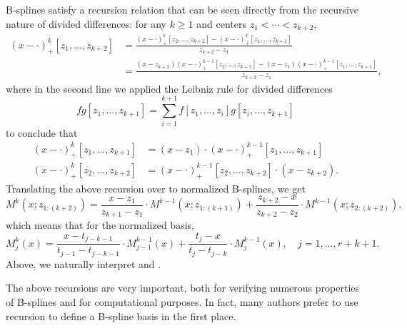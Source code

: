 \documentclass{article}
\begin{document}
B-splines satisfy a recursion relation that can be seen directly from the
recursive nature of divided differences: for any $k \geq 1$ and centers $z_1 <
\cdots < z_{k+2}$,  
\begin{align*}
(x - \cdot)^k_+ [z_1,\dots,z_{k+2}]
&= \frac{(x - \cdot)^k_+[z_2,\dots,z_{k+2}] - 
(x -\cdot)^k_+[z_1,\dots,z_{k+1}]}{z_{k+2} - z_1} \\
&= \frac{(x-z_{k+2})(x - \cdot)^{k-1}_+[z_2,\dots,z_{k+2}] 
- (x-z_1) (x - \cdot)^{k-1}_+[z_1,\dots,z_{k+1}] }{z_{k+2} - z_1},  
\end{align*} 
where in the second line we applied the Leibniz rule for divided differences 
\[
fg [z_1,\dots,z_{k+1}] = \sum_{i=1}^{k+1} f[z_1,\dots,z_i] g[z_i,\dots,z_{k+1}] 
\]
to conclude that
\begin{align*}
(x - \cdot)^k_+ [z_1,\dots,z_{k+1}] &= (x-z_1) \cdot 
(x - \cdot)^{k-1}_+ [z_1,\dots,z_{k+1}] \\
(x - \cdot)^k_+ [z_2,\dots,z_{k+2}] &= (x - \cdot)^{k-1}_+ 
  [z_2,\dots,z_{k+2}] \cdot (x-z_{k+2}). 
\end{align*}
Translating the above recursion over to normalized B-splines, we get 
\[
M^k(x; z_{1:(k+2)}) = \frac{x-z_1}{z_{k+1}-z_1} \cdot 
M^{k-1}(x; z_{1:(k+1)}) + \frac{z_{k+2}-x}{z_{k+2}-z_2} \cdot 
M^{k-1}(x; z_{2:(k+2)}),  
\]
which means that for the normalized basis, 
\[
M^k_j(x) = \frac{x-t_{j-k-1}}{t_{j-1}-t_{j-k-1}} \cdot
M^{k-1}_{j-1}(x) + \frac{t_j-x}{t_j-t_{j-k}} \cdot M^{k-1}_j(x), 
\quad j=1,\dots,r+k+1.  
\]
Above, we naturally interpret  and . 

The above recursions are very important, both for verifying numerous properties
of B-splines and for computational purposes. In fact, many authors prefer to
use recursion to define a B-spline basis in the first place.



\end{document}

